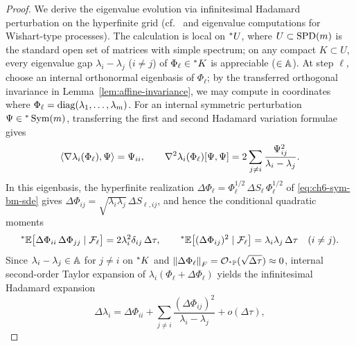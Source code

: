\begin{proof}
We derive the eigenvalue evolution via infinitesimal Hadamard perturbation on the hyperfinite grid (cf.\ \cite{keisler1984infinitesimal} and eigenvalue computations for Wishart-type processes). The calculation is local on ${}^*U$, where $U \subset \operatorname{SPD}(m)$ is the standard open set of matrices with simple spectrum; on any compact $K \subset U$, every eigenvalue gap $\lambda_i - \lambda_j$ ($i \neq j$) of $\Phi_\ell \in {}^*K$ is appreciable ($\in \mathbb{A}$). At step $\ell$, choose an internal orthonormal eigenbasis of $\Phi_\ell$; by the transferred orthogonal invariance in Lemma~\ref{lem:affine-invariance}, we may compute in coordinates where $\Phi_\ell = \operatorname{diag}(\lambda_1, \dots, \lambda_m)$. For an internal symmetric perturbation $\Psi \in {}^*\operatorname{Sym}(m)$, transferring the first and second Hadamard variation formulae gives
\begin{equation}
\label{eq:ch6-hadamard-var}
\left\langle \nabla\lambda_i(\Phi_\ell), \Psi \right\rangle = \Psi_{ii}, \qquad
\nabla^2\lambda_i(\Phi_\ell)[\Psi, \Psi] = 2 \sum_{j \neq i} \frac{\Psi_{ij}^2}{\lambda_i - \lambda_j}.
\end{equation}
In this eigenbasis, the hyperfinite realization $\Delta\Phi_\ell = \Phi_\ell^{1/2}\,\Delta S_\ell\,\Phi_\ell^{1/2}$ of \eqref{eq:ch6-sym-bm-sde} gives $\Delta\Phi_{ij} = \sqrt{\lambda_i \lambda_j}\,\Delta S_{\ell,ij}$, and hence the conditional quadratic moments
\begin{equation}
\label{eq:ch6-eigenbasis-qv}
{}^*\mathbb{E}\bigl[\Delta\Phi_{ii}\,\Delta\Phi_{jj} \mid \mathcal{F}_\ell\bigr] = 2\lambda_i^2 \delta_{ij}\,\Delta\tau, \qquad
{}^*\mathbb{E}\bigl[(\Delta\Phi_{ij})^2 \mid \mathcal{F}_\ell\bigr] = \lambda_i \lambda_j\,\Delta\tau \quad (i \neq j).
\end{equation}
Since $\lambda_i - \lambda_j \in \mathbb{A}$ for $j \neq i$ on ${}^*K$ and $\left\lVert \Delta\Phi_\ell \right\rVert_F = \mathcal{O}_{{}^*\mathbb{P}}(\sqrt{\Delta\tau}) \approx 0$, internal second-order Taylor expansion of $\lambda_i(\Phi_\ell + \Delta\Phi_\ell)$ yields the infinitesimal Hadamard expansion
\begin{equation}
\label{eq:ch6-ito-eigenvalue}
\Delta\lambda_i = \Delta\Phi_{ii} + \sum_{j \neq i} \frac{(\Delta\Phi_{ij})^2}{\lambda_i - \lambda_j} + o(\Delta\tau),
\end{equation}

\end{proof}
